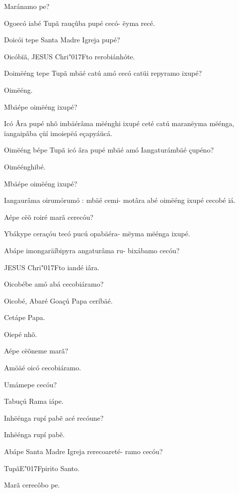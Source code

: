 \documentclass[openany,titlepage,12pt]{book}
\newcommand{\lgS}{\char"017F}
\begin{document}
\begin{alternate}
    \item Maránamo pe?
    \item Ogoecó iabé Tupã rauçûba pupé cecó-
    ëyma recé.
    \item Doicói tepe Santa Madre Igreja pupé?
    \pagebreak
    \item Oicóbïã, JESUS Chri\lgS to rerobiánhóte.
    \item Doimëéng tepe Tupã mbäé catú amó\linebreak
    cecó catüi repyramo ixupé?
    \item Oimëéng.
    \item Mbäépe oimëéng ixupé?
    \item Icó Âra pupé nhõ imbäérâma mëénghi
    ixupé ceté catú maranëyma mëénga,\linebreak
    ïangaipâba çüí imoiepëá eçapyáücá.
    \item Oimëéng bépe Tupã icó âra pupé mbäé
    amó Iangaturámbäé çupéno?
    \item Oimëénghibé.
    \item Mbäépe oimëéng ixupé?
    \item Iangaurâma oirumórumó : mbäé cemi-
    motâra abé oimëéng ixupé cecobé iá.
    \item Aépe cëõ roiré marã cerecóu?
    \item Ybákype ceraçóu tecó pucú opabäéra-\linebreak
    mëyma mëénga ixupé.
    \item Abápe imongaräíbipyra angaturâma ru-
    bixábamo cecóu?
    \item JESUS Chri\lgS to iandé iâra.
    \item Oicobébe amó abá cecobiáramo?
    \item Oicobé, Abaré Goaçú Papa ceríbäé.
    \item Cetápe Papa.
    \item Oiepé nhõ.
    \item Aépe cëõneme marã?
    \item Amöäé oicó cecobiáramo.
    \item Umámepe cecóu?\pagebreak
    \item Tabuçú Rama iápe.
    \item Inhëénga rupí pab\~e acé recóune?
    \item Inhëénga rupí pab\~e.
    \item Abápe Santa Madre Igreja rerecoareté-
    ramo cecóu?
    \item TupãE\lgS pirito Santo.
    \item Marã cerecôbo pe.

\end{alternate}
\end{document}
